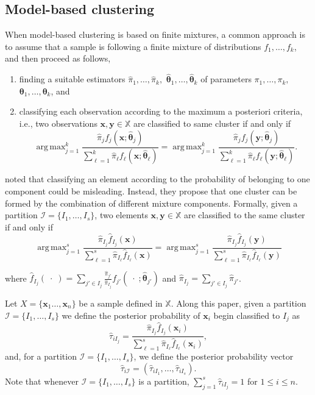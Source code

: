 \documentclass[10pt, a4paper]{article}
\DeclareMathOperator*{\argmax}{arg\,max}
\newcommand{\m}[1]{\boldsymbol{#1}}
\begin{document}
\subsection*{Model-based clustering}

When model-based clustering is based on finite mixtures, a common approach is to assume that a sample is following a finite mixture of distributions $f_1, \dots, f_k$, and then proceed as follows, 
\begin{enumerate}
\item finding a suitable estimators $\hat{\pi}_1, \dots, \hat{\pi}_k,$ $\hat{\m\theta}_1, \dots, \hat{\m\theta}_k$ of parameters $\pi_1, \dots, \pi_k,$ $\m\theta_1, \dots, \m\theta_k$, and
\item classifying each observation according to the maximum a posteriori criteria, i.e., two observations $\m x, \m y \in \mathbb{X}$ are classified to same cluster if and only if
\[
\argmax_{j=1}^k \frac{ \hat{\pi}_j f_j(\m x ; \hat{\m\theta}_j) }{\sum_{\ell=1}^k \hat{\pi}_\ell f_\ell(\m x ; \hat{\m\theta}_\ell) } = \argmax_{j=1}^k \frac{ \hat{\pi}_j f_j(\m y ; \hat{\m\theta}_j) }{ \sum_{\ell=1}^k \hat{\pi}_\ell f_\ell(\m y ; \hat{\m\theta}_\ell) }.
\]
\end{enumerate}


\cite{lee2004combining,hennig2010methods,baudry2010combining,melnykov2013distribution,pastore2013merging} noted that classifying an element according to the probability of belonging to one component could be misleading. Instead, they propose that one cluster can be formed by the combination of different mixture components. Formally, given a partition $\mathcal{I} = \{ I_1, \dots, I_s\}$, two elements $\m x, \m y \in \mathbb{X}$ are classified to the same cluster if and only if
\begin{equation}\label{cluster_criteria}
\argmax_{j=1}^s \frac{ \hat{\pi}_{I_j} \hat{f}_{I_j}(\m x) }{\sum_{\ell=1}^s \hat{\pi}_{I_\ell} \hat{f}_{I_\ell}(\m x ) } = \argmax_{j=1}^s \frac{ \hat{\pi}_{I_j} \hat{f}_{I_j}(\m y) }{ \sum_{\ell=1}^s \hat{\pi}_{I_\ell} \hat{f}_{I_\ell}(\m y) }
\end{equation}

where $\hat{f}_{I_j}(\; \cdot \;) = \sum_{j' \in I_j} \frac{\hat{\pi}_{j'}}{\hat{\pi}_{I_j}} f_{j'}(\; \cdot \; ; \hat{\m\theta}_{j'})$ and $\hat{\pi}_{I_j} =  \sum_{j' \in I_j} \hat{\pi}_{j'}$. 

Let $X = \{\m x_1\dots, \m x_n\}$ be a sample defined in $\mathbb{X}$. Along this paper, given a partition $\mathcal{I} = \{ I_1, \dots, I_s \}$ we define the posterior probability  of $\m x_i$ begin classified to $I_j$ as
\[
\hat{\tau}_{i I_j} =  \frac{ \hat{\pi}_{I_j} \hat{f}_{I_j}(\m x_i) }{\sum_{\ell=1}^s \hat{\pi}_{I_\ell} \hat{f}_{I_\ell}(\m x_i)},
\]
and, for a partition  $\mathcal{I} = \{ I_1, \dots, I_s\}$, we define the posterior probability vector
\[
\hat{\tau}_{i \mathcal{I}} = \left( \hat{\tau}_{i I_1} , \dots, \hat{\tau}_{i I_s}  \right).
\]
Note that whenever  $\mathcal{I} = \{ I_1, \dots, I_s\}$ is a partition, $\sum_{j=1}^s \hat{\tau}_{i I_j} = 1$ for $1 \leq i \leq n$.
\end{document}
